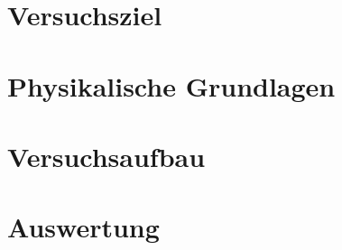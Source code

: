 \documentclass[12pt, a4paper]{scrartcl}
\title{\exptitle}
\subtitle{Fortgeschrittenen Praktikum 1}
\author{Moritz Bitterling und Benjamin Rottler \\ Universität Freiburg}
\date{\expdate}
\numberwithin{equation}{section} %
\begin{document}
\hypersetup{pageanchor=false} %
\maketitle  %
\thispagestyle{empty}

\newpage
\tableofcontents
\thispagestyle{empty}

\newpage
\hypersetup{pageanchor=true} %
\setcounter{page}{1} %

\section{Versuchsziel}
 

\section{Physikalische Grundlagen}


\section{Versuchsaufbau}




\section{Auswertung}

\end{document}
